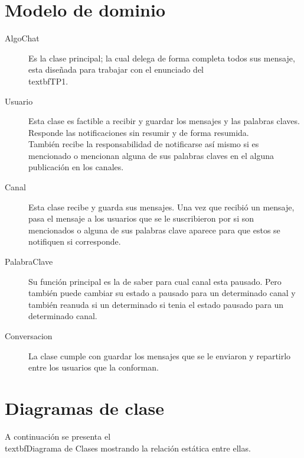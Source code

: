 \documentclass[titlepage,a4paper]{article}
\begin{document}
\section{Modelo de dominio}\label{sec:modelo}
\begin{description}
\item[AlgoChat] Es la clase principal; la cual delega de forma completa todos sus mensaje, esta diseñada para trabajar con el enunciado del \\textbf{TP1}.
\item[Usuario] Esta clase es factible a recibir y guardar los mensajes y las palabras claves. \\Responde las notificaciones sin resumir y de forma resumida.\\
También recibe la responsabilidad de notificarse así mismo si es mencionado o mencionan alguna de sus palabras claves en el alguna publicación en los canales.

\item[Canal] Esta clase recibe y guarda sus mensajes. Una vez que recibió un mensaje, pasa el mensaje a los usuarios que se le suscribieron por si son mencionados o alguna de sus palabras clave aparece para que estos se notifiquen si corresponde.

\item[PalabraClave] Su función principal es la de saber para cual canal esta pausado. Pero también puede cambiar su estado a pausado para un determinado canal y también reanuda si un determinado si tenia el estado pausado para un determinado canal.
\item[Conversacion] La clase cumple con guardar los mensajes que se le enviaron y repartirlo entre los usuarios que la conforman.
\end{description}

\section{Diagramas de clase}\label{sec:diagramasdeclase}

A continuación se presenta el \\textbf{Diagrama de Clases} mostrando la relación estática entre ellas.
\end{document}

